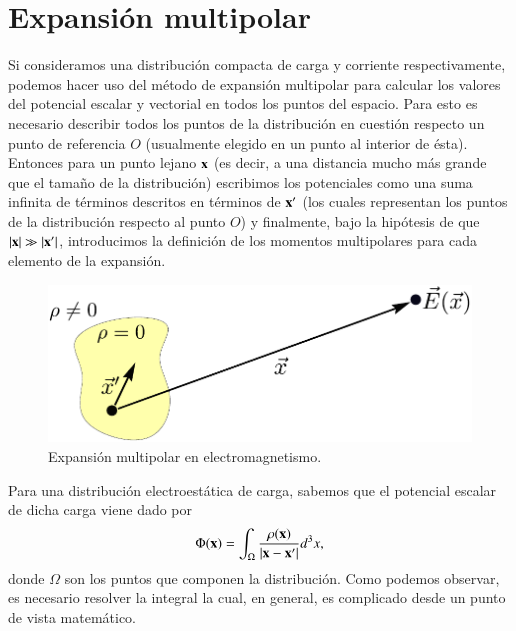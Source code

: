 \section{Expansión multipolar}
\label{sec:2}

Si consideramos una distribución compacta de carga y corriente respectivamente, podemos hacer uso del método de expansión multipolar para calcular los valores del potencial escalar y vectorial en todos los puntos del espacio. Para esto es necesario describir todos los puntos de la distribución en cuestión respecto un punto de referencia $O$ (usualmente elegido en un punto al interior de ésta). Entonces para un punto lejano $\vb{x}$ (es decir, a una distancia mucho más grande que el tamaño de la distribución) escribimos los potenciales como una suma infinita de términos descritos en términos de $\vb{x}'$ (los cuales representan los puntos de la distribución respecto al punto $O$) y finalmente, bajo la hipótesis de que $|\vb{x}| \gg |\vb{x}'|$, introducimos la definición de los momentos multipolares para cada elemento de la expansión.
\begin{figure}[h!]
\centering
\includegraphics[scale=1]{images/multipolar.pdf}
\caption[Expansión multipolar electromagnética]{Expansión multipolar en electromagnetismo.}
\end{figure}

Para una distribución electroestática de carga, sabemos que el potencial escalar de dicha carga viene dado por
\begin{equation}
\Phi(\vb{x}) = \int_{\Omega} \frac{\rho(\vb{x})}{|\vb{x} - \vb{x}'|} d^3x,
\end{equation}
donde $\Omega$ son los puntos que componen la distribución. Como podemos observar, es necesario resolver la integral la cual, en general, es complicado desde un punto de vista matemático. 

